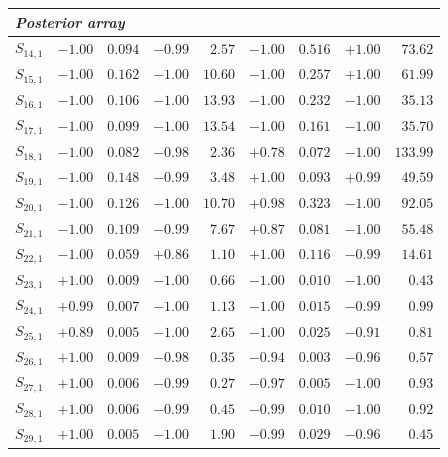\documentclass[
]{article}
\begin{document}
\begin{table}[ht]
\begin{tabular}{l|rr|rr|rr|rr}
\hline
\multicolumn{9}{l}{\textit{Posterior array}} \\
\hline
$S_{14,1}$ & $-1.00$ & $0.094$ & $-0.99$ & $2.57$ & $-1.00$ & $0.516$ & $+1.00$ & $73.62$ \\
$S_{15,1}$ & $-1.00$ & $0.162$ & $-1.00$ & $10.60$ & $-1.00$ & $0.257$ & $+1.00$ & $61.99$ \\
$S_{16,1}$ & $-1.00$ & $0.106$ & $-1.00$ & $13.93$ & $-1.00$ & $0.232$ & $-1.00$ & $35.13$ \\
$S_{17,1}$ & $-1.00$ & $0.099$ & $-1.00$ & $13.54$ & $-1.00$ & $0.161$ & $-1.00$ & $35.70$ \\
$S_{18,1}$ & $-1.00$ & $0.082$ & $-0.98$ & $2.36$ & $+0.78$ & $0.072$ & $-1.00$ & $133.99$ \\
$S_{19,1}$ & $-1.00$ & $0.148$ & $-0.99$ & $3.48$ & $+1.00$ & $0.093$ & $+0.99$ & $49.59$ \\
$S_{20,1}$ & $-1.00$ & $0.126$ & $-1.00$ & $10.70$ & $+0.98$ & $0.323$ & $-1.00$ & $92.05$ \\
$S_{21,1}$ & $-1.00$ & $0.109$ & $-0.99$ & $7.67$ & $+0.87$ & $0.081$ & $-1.00$ & $55.48$ \\
$S_{22,1}$ & $-1.00$ & $0.059$ & $+0.86$ & $1.10$ & $+1.00$ & $0.116$ & $-0.99$ & $14.61$ \\
$S_{23,1}$ & $+1.00$ & $0.009$ & $-1.00$ & $0.66$ & $-1.00$ & $0.010$ & $-1.00$ & $0.43$ \\
$S_{24,1}$ & $+0.99$ & $0.007$ & $-1.00$ & $1.13$ & $-1.00$ & $0.015$ & $-0.99$ & $0.99$ \\
$S_{25,1}$ & $+0.89$ & $0.005$ & $-1.00$ & $2.65$ & $-1.00$ & $0.025$ & $-0.91$ & $0.81$ \\
$S_{26,1}$ & $+1.00$ & $0.009$ & $-0.98$ & $0.35$ & $-0.94$ & $0.003$ & $-0.96$ & $0.57$ \\
$S_{27,1}$ & $+1.00$ & $0.006$ & $-0.99$ & $0.27$ & $-0.97$ & $0.005$ & $-1.00$ & $0.93$ \\
$S_{28,1}$ & $+1.00$ & $0.006$ & $-0.99$ & $0.45$ & $-0.99$ & $0.010$ & $-1.00$ & $0.92$ \\
$S_{29,1}$ & $+1.00$ & $0.005$ & $-1.00$ & $1.90$ & $-0.99$ & $0.029$ & $-0.96$ & $0.45$ \\
\hline
\end{tabular}

\end{table}
\end{document}
